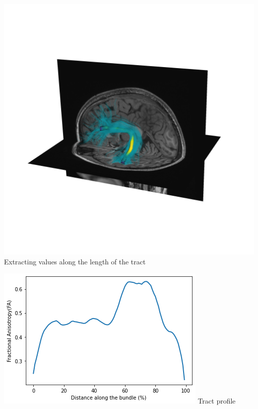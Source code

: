 \documentclass[a0paper,landscape,fontscale=0.365]{baposter}
\newenvironment{Figure}
  {\par\medskip\noindent\minipage{\linewidth}}
  {\endminipage\par\medskip}
\begin{document}
\begin{poster}
{\begin{multicols}{4}
    \columnbreak
    \begin{Figure}
        \centering
        \includegraphics[width=1.0\linewidth]{figures/arc_profile_trk}
        Extracting values along the length of the tract
    \end{Figure}
    \columnbreak
    \begin{Figure}
        \vspace{1.0cm}
        \centering
        \includegraphics[width=1.0\linewidth]{figures/tract_profile}
        Tract profile
    \end{Figure}


\end{multicols}}
\end{poster}
\end{document}
